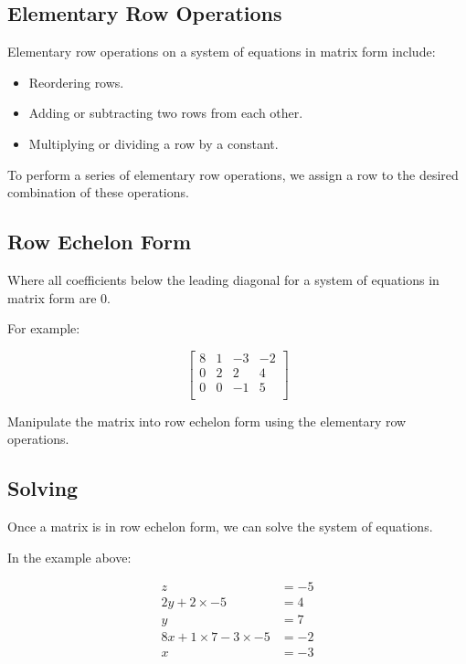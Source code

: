 \documentclass[a4paper,11pt]{article}
\begin{document}
\subsection{Elementary Row Operations}

Elementary row operations on a system of equations in matrix form include:

\begin{itemize}
\item Reordering rows.
\item Adding or subtracting two rows from each other.
\item Multiplying or dividing a row by a constant.
\end{itemize}

To perform a series of elementary row operations, we assign a row to the desired
combination of these operations.


\subsection{Row Echelon Form}

Where all coefficients below the leading diagonal for a system of equations in
matrix form are 0.

For example:

$$
\begin{bmatrix}
8 & 1 & -3 & -2 \\
0 & 2 &  2 &  4 \\
0 & 0 & -1 &  5 \\
\end{bmatrix}
$$

Manipulate the matrix into row echelon form using the elementary row operations.


\subsection{Solving}

Once a matrix is in row echelon form, we can solve the system of equations.

In the example above:

$$
\begin{aligned}
z & = -5 \\
2y + 2 \times -5 & = 4 \\
y & = 7 \\
8x + 1 \times 7 - 3 \times -5 & = -2 \\
x & = -3 \\
\end{aligned}
$$
\end{document}
